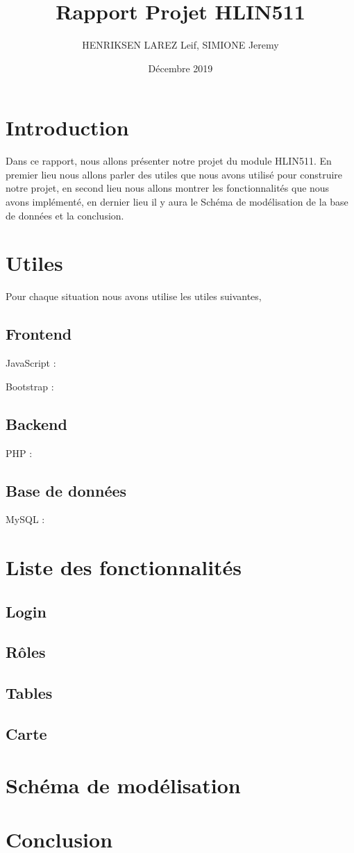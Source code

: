 \documentclass[french]{article}
\title{Rapport Projet HLIN511}
\author{HENRIKSEN LAREZ Leif, SIMIONE Jeremy}
\date{Décembre 2019}
\begin{document}
    \begin{titlepage}
        \clearpage\maketitle
        \thispagestyle{empty}
    \end{titlepage}
    \newpage
        \tableofcontents
    \newpage
        \section{Introduction}
            Dans ce rapport, nous allons présenter notre projet du module HLIN511. En premier lieu nous allons parler des utiles que nous avons utilisé pour construire notre projet, en second lieu nous allons montrer les fonctionnalités que nous avons implémenté, en dernier lieu il y aura le Schéma de modélisation de la base de données et la conclusion.
    \newpage
        \section{Utiles}
            Pour chaque situation nous avons utilise les utiles suivantes,
            \subsection{Frontend}
            JavaScript : 
            \par
            Bootstrap : 
            \subsection{Backend}
            PHP :
            \subsection{Base de données}
            MySQL :
        \section{Liste des fonctionnalités}
            \subsection{Login}
            \subsection{Rôles}
            \subsection{Tables}
            \subsection{Carte}
        \section{Schéma de modélisation}
        \section{Conclusion}
\end{document}
